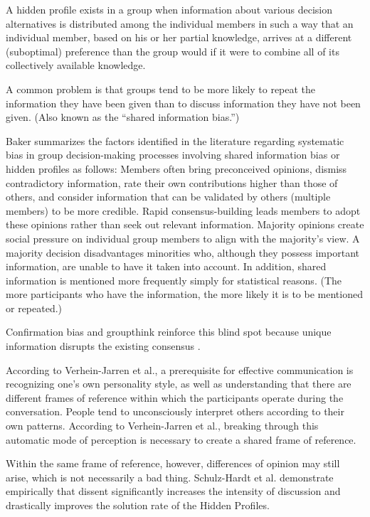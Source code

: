 A hidden profile exists in a group when information about
various decision alternatives is distributed among the individual members in such a way that an individual
member, based on his or her partial knowledge, arrives at a different (suboptimal) preference than the group would if
it were to combine all of its collectively available knowledge. \cite[p.
257]{bakerEnhancingGroupDecision2010}

A common problem is that groups tend to be more likely to
repeat the information they have been given than to discuss information they have not been given. \cite[p.
619]{stewartExpertRoleAssignment1995} (Also known as the “shared information bias.”)

Baker summarizes the factors identified in the literature regarding systematic bias in
group decision-making processes involving shared information bias or hidden profiles as follows:
Members often bring preconceived opinions, dismiss contradictory information, rate their own contributions
higher than those of others, and consider information that can be validated by others (multiple members) to
be more credible.
Rapid consensus-building leads members to adopt these opinions rather than seek out relevant information.
Majority opinions create social pressure on individual group members to align with the majority’s view. A
majority decision disadvantages minorities who, although they possess important information, are unable to
have it taken into account. In addition, shared information is mentioned more frequently simply for statistical reasons.
(The more participants who have the information, the more likely it is to be mentioned or repeated.)
\cite[p. 261f.]{bakerEnhancingGroupDecision2010}

Confirmation bias and groupthink reinforce this blind spot because unique information disrupts the existing
consensus \cite{bakerEnhancingGroupDecision2010,schulz-hardtGroupDecisionMaking2006}.

According to Verhein-Jarren et al., a prerequisite for effective communication is recognizing one’s own
personality style, as well as understanding that there are different frames of reference within which the
participants operate during the conversation. People tend to unconsciously interpret others according to
their own patterns. According to Verhein-Jarren et al., breaking through this automatic mode of perception
is necessary to create a shared frame of reference.
\cite[p.9]{verhein-jarrenGespraechsfuehrungTechnischenBerufen2018}

Within the same frame of reference, however, differences of opinion may still arise, which is not necessarily
a bad thing. Schulz-Hardt et al. demonstrate empirically that dissent significantly increases the intensity
of discussion and drastically improves the solution rate of the Hidden
Profiles. \cite[p. 1080]{schulz-hardtGroupDecisionMaking2006}

